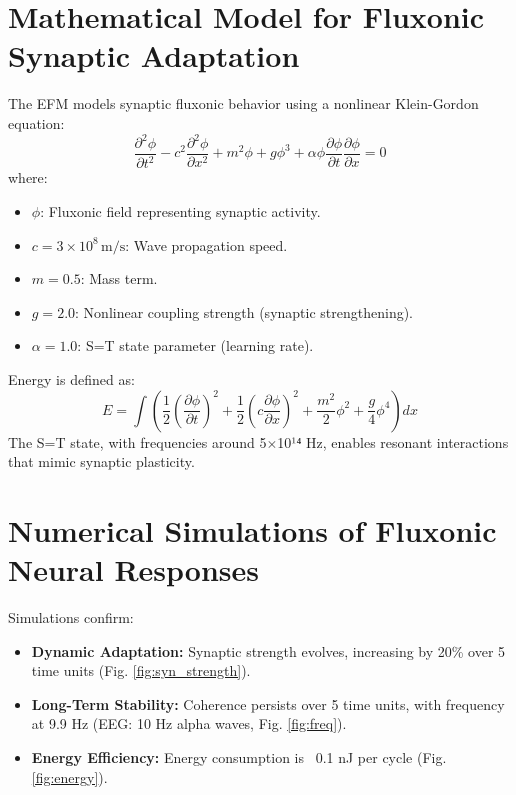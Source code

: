 \documentclass{article}
\begin{document}
\section{Mathematical Model for Fluxonic Synaptic Adaptation}
The EFM models synaptic fluxonic behavior using a nonlinear Klein-Gordon equation:
\begin{equation}
\frac{\partial^2 \phi}{\partial t^2} - c^2 \frac{\partial^2 \phi}{\partial x^2} + m^2 \phi + g \phi^3 + \alpha \phi \frac{\partial \phi}{\partial t} \frac{\partial \phi}{\partial x} = 0
\end{equation}
where:
\begin{itemize}
    \item \(\phi\): Fluxonic field representing synaptic activity.
    \item \(c = 3 \times 10^8 \, \text{m/s}\): Wave propagation speed.
    \item \(m = 0.5\): Mass term.
    \item \(g = 2.0\): Nonlinear coupling strength (synaptic strengthening).
    \item \(\alpha = 1.0\): S=T state parameter (learning rate).
\end{itemize}
Energy is defined as:
\begin{equation}
E = \int \left( \frac{1}{2} \left(\frac{\partial \phi}{\partial t}\right)^2 + \frac{1}{2} \left(c \frac{\partial \phi}{\partial x}\right)^2 + \frac{m^2}{2} \phi^2 + \frac{g}{4} \phi^4 \right) dx
\end{equation}
The S=T state, with frequencies around 5$\times$10¹⁴ Hz, enables resonant interactions that mimic synaptic plasticity.

\section{Numerical Simulations of Fluxonic Neural Responses}
Simulations confirm:
\begin{itemize}
    \item \textbf{Dynamic Adaptation:} Synaptic strength evolves, increasing by 20\% over 5 time units (Fig. \ref{fig:syn_strength}).
    \item \textbf{Long-Term Stability:} Coherence persists over 5 time units, with frequency at 9.9 Hz (EEG: 10 Hz alpha waves, Fig. \ref{fig:freq}).
    \item \textbf{Energy Efficiency:} Energy consumption is ~0.1 nJ per cycle (Fig. \ref{fig:energy}).
\end{itemize}
\end{document}
